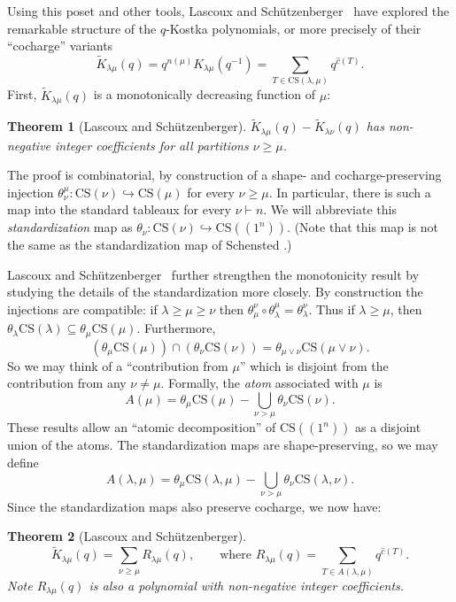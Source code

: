\documentclass[12pt]{article}
\newcommand{\la}{{\lambda}}
\newcommand{\ptn}{\vdash}
\newcommand{\Klm}{K_{\la \mu}}
\newcommand{\Klmt}{\tilde{K}_{\la \mu}}
\newcommand{\Klt}[1]{\tilde{K}_{\la {#1}}}
\newcommand{\cocharge}{\hat{c}}
\newcommand{\ccg}{\cocharge}
\newcommand{\join}{\vee}
\newcommand{\inject}{\hookrightarrow}
\newcommand{\compose}{\circ}
\newcommand{\stdzn}[2][{}]{\theta_{#2}^{#1}}
\newcommand{\CSlm}{\text{CS}(\la,\mu)}
\newcommand{\CSl}[1]{\text{CS}(\la,#1)}
\newcommand{\CSm}{\text{CS}(\mu)}
\newcommand{\CS}[1]{\text{CS}(#1)}
\newcommand{\LS}{Lascoux and Sch\"{u}tzenberger}
\numberwithin{equation}{section}
\theoremstyle{plain}
\newtheorem{theorem}{Theorem}[section]
\theoremstyle{definition}
\theoremstyle{remark}
\begin{document}
Using this poset and other tools, \LS~\cite{L&S:Croissance,
Lascoux} have explored the remarkable structure of the
$q$-Kostka polynomials, or more precisely of their ``cocharge''
variants
\begin{equation}
\Klmt(q) = q^{n(\mu)} \Klm(q^{-1}) = \sum_{T\in \CSlm}q^{\ccg(T)}.
\end{equation}
First, $\Klmt(q)$ is a monotonically decreasing function of $\mu$:
\begin{theorem}[\LS]  
$\Klmt(q)-\Klt{\nu}(q)$ has non-negative integer coefficients for all
partitions $\nu\geq\mu$.
\end{theorem}
The proof is combinatorial, by construction of a shape- and
cocharge-preserving injection $\stdzn[\mu]{\nu}:\CS{\nu}\inject\CSm$
for every $\nu\geq\mu$.  In particular, there is such a map into the
standard tableaux for every $\nu\ptn n$.  We will abbreviate this {\em
standardization} map as $\stdzn{\nu}:\CS{\nu}\inject\CS{(1^n)}$.
(Note that this map is not the same as the standardization map of
Schensted \cite{Schensted61}.)

\LS\ \cite{L&S:Plaxique,Lascoux} further strengthen the monotonicity result 
by studying the details of the standardization more closely.  
By construction the injections are compatible: if $\la\geq\mu\geq\nu$
then $\stdzn[\nu]{\mu}\compose \stdzn[\mu]{\la} =
\stdzn[\nu]{\la}$.  Thus if $\la\geq\mu$, then 
$\stdzn{\la}\CS{\la}\subseteq\stdzn{\mu}\CSm$. 
Furthermore, 
\begin{equation}
(\stdzn{\mu} \CSm) \cap (\stdzn{\nu}\CS{\nu})
= \stdzn{\mu\join\nu}\CS{\mu\join\nu}.
\end{equation}
So we may think of a ``contribution from $\mu$'' which is disjoint
from the contribution from any $\nu\neq\mu$.  Formally, the {\em atom}
associated with $\mu$ is
\begin{equation}
	A(\mu)=\stdzn{\mu}\CSm-\bigcup_{\nu>\mu}\stdzn{\nu}\CS{\nu}.
	\label{Latom}
\end{equation}
These results allow an ``atomic decomposition'' of $\CS{(1^n)}$ as a
disjoint union of the atoms.  The standardization maps are
shape-preserving, so we may define 
\begin{equation}
A(\la,\mu)=\stdzn{\mu}\CSlm-\bigcup_{\nu>\mu}\stdzn{\nu}\CSl{\nu}.
\end{equation}
Since the standardization maps also preserve cocharge, we now have:
\begin{theorem}[\LS]
\begin{equation}\label{eq:AtomDecompKlmt}
\Klmt(q) = \sum_{\nu\geq\mu} R_{\la\mu}(q), \qquad\text{where }
R_{\la\mu}(q) = \sum_{T\in A(\la,\mu)}q^{\ccg(T)}.
\end{equation}
Note $R_{\la\mu}(q)$ is also a polynomial with non-negative integer
coefficients.
\end{theorem}
\end{document}
